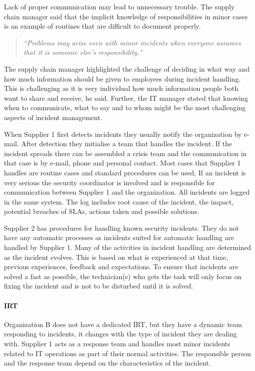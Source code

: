 Lack of proper communication may lead to unnecessary trouble. The supply chain manager said that the implicit knowledge of responsibilities in minor cases is an example of routines that are difficult to document properly.

\begin{quote}
\textit{``Problems may arise even with minor incidents when everyone assumes that it is someone else's responsibility."}
\end{quote}

The supply chain manager highlighted the challenge of deciding in what way and how much information should be given to employees during incident handling. This is challenging as it is very individual how much information people both want to share and receive, he said. Further, the IT manager stated that knowing when to communicate, what to say and to whom might be the most challenging aspects of incident management.

When Supplier 1 first detects incidents they usually notify the organization by e-mail. After detection they initialise a team that handles the incident. If the incident spreads there can be assembled a crisis team and the communication in that case is by e-mail, phone and personal contact. Most cases that Supplier 1 handles are routine cases and standard procedures can be used. If an incident is very serious the security coordinator is involved and is responsible for communication between Supplier 1 and the organization. All incidents are logged in the same system. The log includes root cause of the incident, the impact, potential breaches of \acp{SLA}, actions taken and possible solutions. 

Supplier 2 has procedures for handling known security incidents. They do not have any automatic processes as incidents suited for automatic handling are handled by Supplier 1. Many of the activities in incident handling are determined as the incident evolves. This is based on what is experienced at that time, previous experiences, feedback and expectations. To ensure that incidents are solved a fast as possible, the technician(s) who gets the task will only focus on fixing the incident and is not to be disturbed until it is solved. 

\paragraph{\acl{IRT}}
Organization B does not have a dedicated IRT, but they have a dynamic team responding to incidents, it changes with the type of incident they are dealing with. Supplier 1 acts as a response team and handles most minor incidents related to IT operations as part of their normal activities. The responsible person and the response team depend on the characteristics of the incident.   

